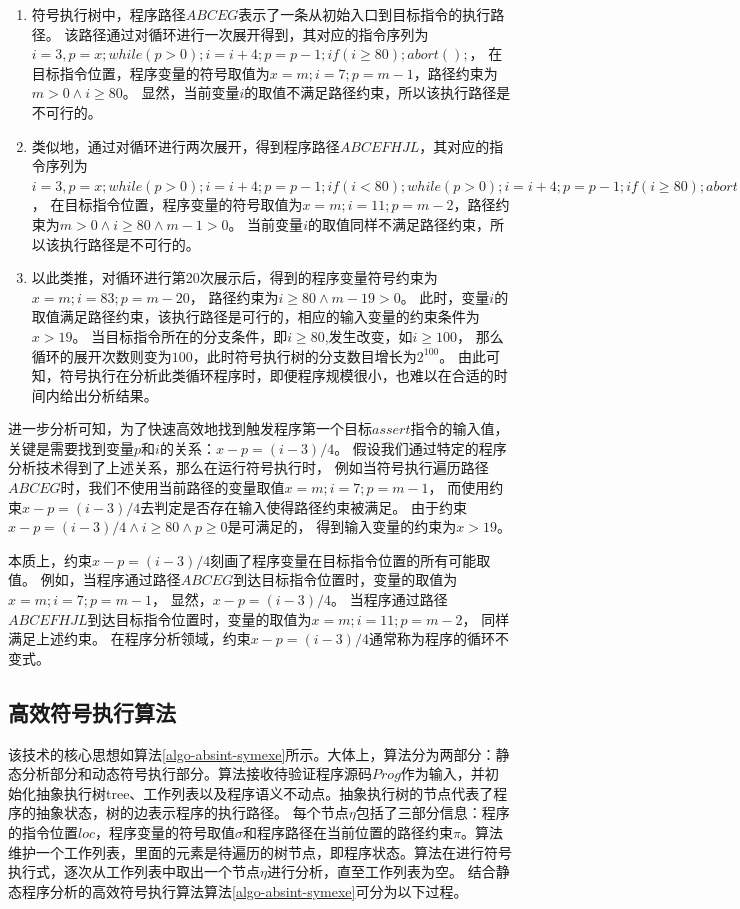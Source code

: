 \begin{enumerate}
\item 符号执行树中，程序路径$ABCEG$表示了一条从初始入口到目标指令的执行路径。
该路径通过对循环进行一次展开得到，其对应的指令序列为
$i=3,p=x;while(p>0);i=i+4;p=p-1;if(i\geq 80);abort();$，
在目标指令位置，程序变量的符号取值为$x=m;i=7;p=m-1$，路径约束为$m>0\wedge i\geq 80$。
显然，当前变量$i$的取值不满足路径约束，所以该执行路径是不可行的。
\item 类似地，通过对循环进行两次展开，得到程序路径$ABCEFHJL$，其对应的指令序列为
$i=3,p=x;while(p>0);i=i+4;p=p-1;if(i < 80);while(p>0);i=i+4;p=p-1;if(i\geq 80);abort()$，
在目标指令位置，程序变量的符号取值为$x=m;i=11;p=m-2$，路径约束为$m>0\wedge i\geq 80 \wedge m-1>0$。
当前变量$i$的取值同样不满足路径约束，所以该执行路径是不可行的。
\item 以此类推，对循环进行第20次展示后，得到的程序变量符号约束为$x=m;i=83;p=m-20$，
路径约束为$i\geq 80 \wedge m-19>0$。
此时，变量$i$的取值满足路径约束，该执行路径是可行的，相应的输入变量的约束条件为$x>19$。
当目标指令所在的分支条件，即$i\geq 80$,发生改变，如$i\geq 100$，
那么循环的展开次数则变为$100$，此时符号执行树的分支数目增长为$2^{100}$。
由此可知，符号执行在分析此类循环程序时，即便程序规模很小，也难以在合适的时间内给出分析结果。
\end{enumerate}

进一步分析可知，为了快速高效地找到触发程序第一个目标$assert$指令的输入值，
关键是需要找到变量$p$和$i$的关系：$x-p = (i-3)/4$。
假设我们通过特定的程序分析技术得到了上述关系，那么在运行符号执行时，
例如当符号执行遍历路径$ABCEG$时，我们不使用当前路径的变量取值$x=m;i=7;p=m-1$，
而使用约束$x-p = (i-3)/4$去判定是否存在输入使得路径约束被满足。
由于约束$x-p = (i-3)/4 \wedge i\geq 80 \wedge p \geq 0$是可满足的，
得到输入变量的约束为$x>19$。

本质上，约束$x-p = (i-3)/4$刻画了程序变量在目标指令位置的所有可能取值。
例如，当程序通过路径$ABCEG$到达目标指令位置时，变量的取值为$x=m;i=7;p=m-1$，
显然，$x-p = (i-3)/4$。
当程序通过路径$ABCEFHJL$到达目标指令位置时，变量的取值为$x=m;i=11;p=m-2$，
同样满足上述约束。
在程序分析领域，约束$x-p = (i-3)/4$通常称为程序的循环不变式。


\subsection{高效符号执行算法}

该技术的核心思想如算法\ref{algo-absint-symexe}所示。大体上，算法分为两部分：静态分析部分和动态符号执行部分。算法接收待验证程序源码$Prog$作为输入，并初始化抽象执行树tree、工作列表以及程序语义不动点。抽象执行树的节点代表了程序的抽象状态，树的边表示程序的执行路径。
每个节点$\eta$包括了三部分信息：程序的指令位置$loc$，程序变量的符号取值$\sigma$和程序路径在当前位置的路径约束$\pi$。算法维护一个工作列表，里面的元素是待遍历的树节点，即程序状态。算法在进行符号执行式，逐次从工作列表中取出一个节点$\eta$进行分析，直至工作列表为空。
结合静态程序分析的高效符号执行算法算法\ref{algo-absint-symexe}可分为以下过程。

